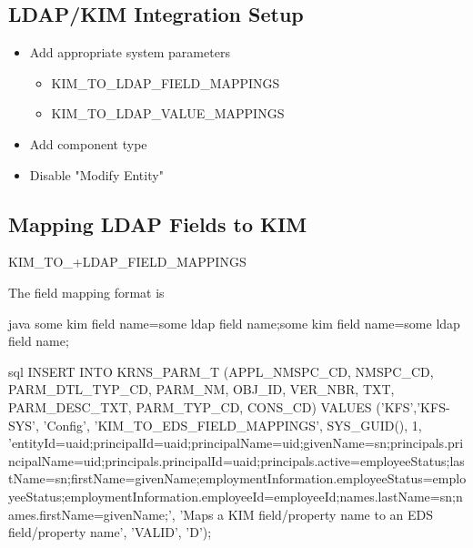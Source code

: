 \documentclass[12pt,notitlepage]{article}
\begin{document}
\begin{s5presentation}
\begin{s5slide}
    \W \end{s5slide}

%
%
  \W \begin{s5slide}
    \section{LDAP/KIM Integration Setup}
    \begin{itemize}
      \item Add appropriate system parameters
        \begin{itemize}
          \item KIM_TO_LDAP_FIELD_MAPPINGS
          \item KIM_TO_LDAP_VALUE_MAPPINGS
        \end{itemize}
      \item Add component type
      \item Disable "Modify Entity"
    \end{itemize}

    \W \end{s5slide}

%
%
  \W \begin{s5slide}
    \section{Mapping LDAP Fields to KIM}
    KIM_TO_+LDAP_FIELD_MAPPINGS

    The field mapping format is 
    \begin{code}{java}
some kim field name=some ldap field name;some kim field name=some ldap field name;
    \end{code}


    \begin{code}{sql}
INSERT INTO KRNS_PARM_T 
(APPL_NMSPC_CD, NMSPC_CD, PARM_DTL_TYP_CD, PARM_NM, OBJ_ID, VER_NBR, TXT, PARM_DESC_TXT, PARM_TYP_CD, CONS_CD)
VALUES ('KFS','KFS-SYS', 'Config', 'KIM_TO_EDS_FIELD_MAPPINGS', SYS_GUID(), 1, 'entityId=uaid;principalId=uaid;principalName=uid;givenName=sn;principals.principalName=uid;principals.principalId=uaid;principals.active=employeeStatus;lastName=sn;firstName=givenName;employmentInformation.employeeStatus=employeeStatus;employmentInformation.employeeId=employeeId;names.lastName=sn;names.firstName=givenName;', 'Maps a KIM field/property name to an EDS field/property name', 'VALID', 'D');
    \end{code}
      \W \end{s5slide}


\end{s5presentation}
\end{document}
